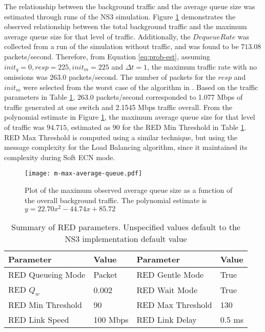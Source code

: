 The relationship between the background traffic and the average queue size was estimated through runs of the \ac{NS3} simulation.
Figure \ref{fig:plotm} demonstrates the observed relationship between the total background traffic and the maximum average queue size for that level of traffic.
Additionally, the $DequeueRate$ was collected from a run of the simulation without traffic, and was found to be $713.08$ packets/second.
Therefore, from Equation \ref{eq:prob-est}, assuming $init_q=0, resp=225, init_m=225$ and $\Delta t=1$, the maximum traffic rate with no omissions was $263.0$ packets/second.
The number of packets for the $resp$ and $init_m$ were selected from the worst case of the algorithm in \cite{JOURNAL}.
Based on the traffic parameters in Table \ref{tab:red-parameters}, $263.0$ packets/second corresponded to 1.077 Mbps of traffic generated at one switch and 2.1545 Mbps traffic overall.
From the polynomial estimate in Figure \ref{fig:plotm}, the maximum average queue size for that level of traffic was $94.715$, estimated as $90$ for the \ac{RED} Min Threshold in Table \ref{tab:red-parameters}.
RED Max Threshold is computed using a similar technique, but using the message complexity for the Load Balancing algorithm, since it maintained its complexity during Soft ECN mode.

\begin{figure}
\centering
\texttt{[image: m-max-average-queue.pdf]}
\caption{Plot of the maximum observed average queue size as a function of the overall background traffic. The polynomial estimate is $y=22.70x^2-44.74x+85.72$}
\label{fig:plotm}
\end{figure}

\begin{table}
\begin{center}
\begin{tabular}{ | l | l || l | l | } \hline
Parameter & Value & Parameter & Value        \\ \hline
RED Queueing Mode & Packet & RED Gentle Mode & True    \\ \hline
RED $Q_{w}$ & 0.002 & RED Wait Mode & True      \\ \hline
RED Min Threshold & 90 & RED Max Threshold & 130   \\ \hline
RED Link Speed & 100 Mbps & RED Link Delay & 0.5 ms   \\ \hline
\end{tabular}
\end{center}
\caption{Summary of \ac{RED} parameters. Unspecified values default to the \ac{NS3} implementation default value}
\label{tab:red-parameters}
\end{table}

